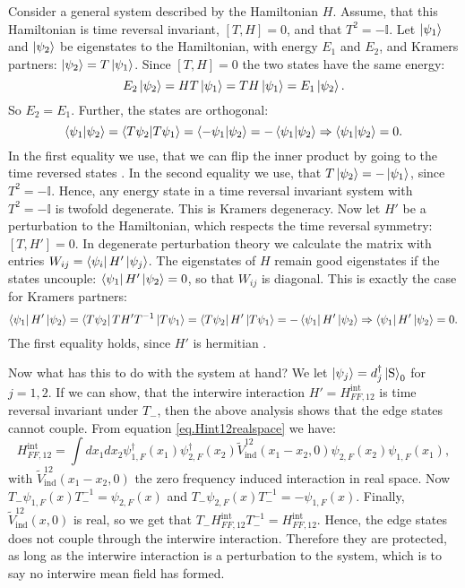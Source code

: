 Consider a general system described by the Hamiltonian $H$. Assume, that this Hamiltonian is time reversal invariant, $[T, H] = 0$, and that $T^2 = -\mathbb{I}$. Let $\ket{\psi_1}$ and $\ket{\psi_2}$ be eigenstates to the Hamiltonian, with energy $E_1$ and $E_2$, and Kramers partners: $\ket{\psi_2} = T\ket{\psi_1}$. Since $[T, H] = 0$ the two states have the same energy: 
\begin{equation}
E_2\ket{\psi_2} = HT\ket{\psi_1} = TH\ket{\psi_1} = E_1\ket{\psi_2}. \nonumber
\end{equation}
So $E_2 = E_1$. Further, the states are orthogonal:
\begin{equation}
\braket{\psi_1|\psi_2} = \braket{T\psi_2|T\psi_1} = \braket{-\psi_1|\psi_2} = -\braket{\psi_1|\psi_2} \Rightarrow \braket{\psi_1|\psi_2} = 0. \nonumber  
\end{equation}
In the first equality we use, that we can flip the inner product by going to the time reversed states \cite[p. 274]{Sakurai}. In the second equality we use, that $T\ket{\psi_2} = -\ket{\psi_1}$, since $T^2 = -\mathbb{I}$. Hence, any energy state in a time reversal invariant system with $T^2 = -\mathbb{I}$ is twofold degenerate. This is Kramers degeneracy. Now let $H'$ be a perturbation to the Hamiltonian, which respects the time reversal symmetry: $[T, H'] = 0$. In degenerate perturbation theory we calculate the matrix with entries $W_{ij} = \bra{\psi_i}H'\ket{\psi_j}$. The eigenstates of $H$ remain good eigenstates if the states uncouple: $\bra{\psi_1}H'\ket{\psi_2} = 0$, so that $W_{ij}$ is diagonal. This is exactly the case for Kramers partners: 
\begin{equation}
\bra{\psi_1}H'\ket{\psi_2} = \bra{T\psi_2}TH'T^{-1}\ket{T\psi_1} = \bra{T\psi_2}H'\ket{T\psi_1} = -\bra{\psi_1}H'\ket{\psi_2} \Rightarrow \bra{\psi_1}H'\ket{\psi_2} = 0. \nonumber
\end{equation}
The first equality holds, since $H'$ is hermitian \cite{Sakurai}. 

Now what has this to do with the system at hand? We let $\ket{\psi_j} = d^\dagger_j\ket{\text{S}}_0$ for $j = 1, 2$. If we can show, that the interwire interaction $H' = H^\text{int}_{FF,12}$ is time reversal invariant under $T_-$, then the above analysis shows that the edge states cannot couple. From equation \eqref{eq.Hint12realspace} we have:
\begin{equation}
H^\text{int}_{FF,12} = \int dx_1 dx_2 \psi^\dagger_{1,F}(x_1)\psi^\dagger_{2,F}(x_2) \tilde{V}_{\text{ind}}^{12}(x_1-x_2,0) \psi_{2,F}(x_2)\psi_{1,F}(x_1),
\end{equation}
with $\tilde{V}_{\text{ind}}^{12}(x_1-x_2,0)$ the zero frequency induced interaction in real space. Now $T_-\psi_{1,F}(x)T^{-1}_- = \psi_{2,F}(x)$ and $T_-\psi_{2,F}(x)T^{-1}_- = -\psi_{1,F}(x)$. Finally, $\tilde{V}_{\text{ind}}^{12}(x, 0)$ is real, so we get that $T_-H^\text{int}_{FF,12}T_-^{-1} = H^\text{int}_{FF,12}$. Hence, the edge states does not couple through the interwire interaction. Therefore they are protected, as long as the interwire interaction is a perturbation to the system, which is to say no interwire mean field has formed.  

